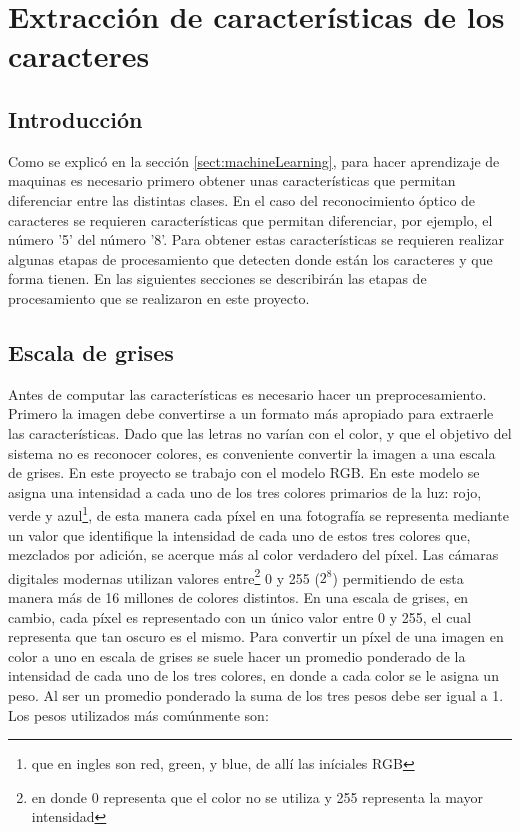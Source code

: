 \documentclass[a4paper, 11pt, oneside]{report}
\begin{document}
\chapter{Extracción de características de los caracteres}
\label{chap:features}

\section{Introducción}

Como se explicó en la sección \ref{sect:machineLearning}, para hacer aprendizaje de maquinas es necesario primero obtener unas características que permitan diferenciar entre las distintas clases. En el caso del reconocimiento óptico de caracteres se requieren características que permitan diferenciar, por ejemplo, el número '5' del número '8'. Para obtener estas características se requieren realizar algunas etapas de procesamiento que detecten donde están los caracteres y que forma tienen. En las siguientes secciones se describirán las etapas de procesamiento que se realizaron en este proyecto.

\section{Escala de grises}

Antes de computar las características es necesario hacer un preprocesamiento. Primero la imagen debe convertirse a un formato más apropiado para extraerle las características. Dado que las letras no varían con el color, y que el objetivo del sistema no es reconocer colores, es conveniente convertir la imagen a una escala de grises. En este proyecto se trabajo con el modelo RGB. En este modelo se asigna una intensidad a cada uno de los tres colores primarios de la luz: rojo, verde y azul\footnote{que en ingles son red, green, y blue, de allí las iníciales RGB}, de esta manera cada píxel en una fotografía se representa mediante un valor que identifique la intensidad de cada uno de estos tres colores que, mezclados por adición, se acerque más al color verdadero del píxel. Las cámaras digitales modernas utilizan valores entre\footnote{en donde 0 representa que el color no se utiliza y 255 representa la mayor intensidad} 0 y 255 ($2^8$) permitiendo de esta manera más de 16 millones de colores distintos. En una escala de grises, en cambio, cada píxel es representado con un único valor entre 0 y 255, el cual representa que tan oscuro es el mismo. Para convertir un píxel de una imagen en color a uno en escala de grises se suele hacer un promedio ponderado de la intensidad de cada uno de los tres colores, en donde a cada color se le asigna un peso. Al ser un promedio ponderado la suma de los tres pesos debe ser igual a 1. Los pesos utilizados más comúnmente son:
\end{document}
